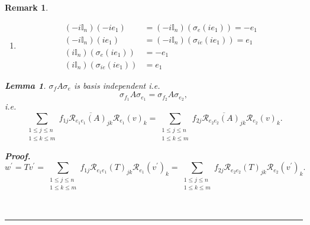 \documentclass[aps,preprint]{revtex4}%
\newtheorem{lemma}[theorem]{Lemma}
\newtheorem{remark}[theorem]{Remark}
\newenvironment{proof}[1][Proof]{\noindent\textbf{#1.} }{\ \rule{0.5em}{0.5em}}
\begin{document}
\begin{remark}
\begin{enumerate}
\begin{enumerate}
\item
\begin{align}
\left(  -i\mathbb{I}_{n}\right)  \left(  -ie_{1}\right)   &  =\left(
-i\mathbb{I}_{n}\right)  \left(  \sigma_{e}\left(  ie_{1}\right)  \right)
=-e_{1}\\
\left(  -i\mathbb{I}_{n}\right)  \left(  ie_{1}\right)   &  =\left(
-i\mathbb{I}_{n}\right)  \left(  \sigma_{ie}\left(  ie_{1}\right)  \right)
=e_{1}\\
\left(  i\mathbb{I}_{n}\right)  \left(  \sigma_{e}\left(  ie_{1}\right)
\right)   &  =-e_{1}\\
\left(  i\mathbb{I}_{n}\right)  \left(  \sigma_{ie}\left(  ie_{1}\right)
\right)   &  =e_{1}%
\end{align}

\end{enumerate}

\begin{lemma}
$\mathcal{\sigma}_{f}A\mathcal{\sigma}_{e}$ is basis independent i.e.
\begin{equation}
\mathcal{\sigma}_{f_{1}}A\mathcal{\sigma}_{e_{1}}=\mathcal{\sigma}_{f_{2}%
}A\mathcal{\sigma}_{e_{2}},
\end{equation}
i.e.%
\begin{equation}
\sum_{\substack{1\leq j\leq n\\1\leq k\leq m}}f_{1j}\overline{\mathcal{R}%
_{e_{1}e_{1}}\left(  A\right)  _{jk}}\mathcal{R}_{e_{1}}\left(  v\right)
_{k}=\sum_{\substack{1\leq j\leq n\\1\leq k\leq m}}f_{2j}\overline
{\mathcal{R}_{e_{2}e_{2}}\left(  A\right)  _{jk}}\mathcal{R}_{e_{2}}\left(
v\right)  _{k}.
\end{equation}

\end{lemma}

\begin{proof}%
\begin{equation}
w^{\prime}=Tv^{\prime}=\sum_{\substack{1\leq j\leq n\\1\leq k\leq m}%
}f_{1j}\mathcal{R}_{e_{1}e_{1}}\left(  T\right)  _{jk}\mathcal{R}_{e_{1}%
}\left(  v^{\prime}\right)  _{k}=\sum_{\substack{1\leq j\leq n\\1\leq k\leq
m}}f_{2j}\mathcal{R}_{e_{2}e_{2}}\left(  T\right)  _{jk}\mathcal{R}_{e_{2}%
}\left(  v^{\prime}\right)  _{k}.
\end{equation}

\end{proof}
\end{enumerate}
\end{remark}
\end{document}

